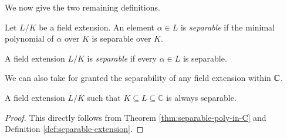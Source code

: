 We now give the two remaining definitions.


\begin{definition}
    Let $L/K$ be a field extension. An element $\alpha \in L$ is \textit{separable} if the minimal polynomial of $\alpha$ over $K$ is separable over $K$.
\end{definition}

\begin{definition} \label{def:separable-extension}
    A field extension $L / K$ is \textit{separable} if every $\alpha \in L$ is separable.
\end{definition}

We can also take for granted the separability of any field extension within $\mathbb C$.

\begin{theorem} \label{thm:separable-extension-in-C}
    A field extension $L/K$ such that $K \subseteq L \subseteq \mathbb C$ is always separable. 
\end{theorem}

\begin{proof}
    This directly follows from Theorem \ref{thm:separable-poly-in-C} and Definition \ref{def:separable-extension}. 
\end{proof}
